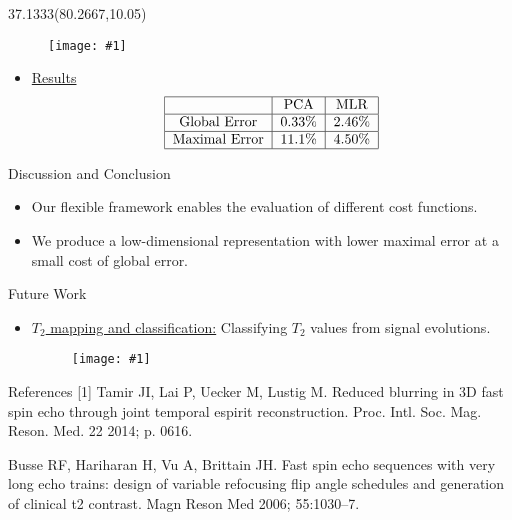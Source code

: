 \documentclass[t]{beamer}
\newcommand{\n}{\par \smallskip}
\newcommand{\imgnobox}[2]{\begin{figure}[htp]\texttt{[image: \#1]}\end{figure}}
\newcommand{\colwidth}{37.1333}
\begin{document}
{%
\begin{textblock}{\colwidth}(80.2667,10.05)
  \begin{frame}
  \begin{block}{\vspace*{-3ex}}
  \imgnobox{algo.png}{0.85}
  \begin{itemize}
  \item{\underline{Results}}
  $$\begin{tabular}{|c|c|c|} \hline
   & \text{PCA} & \text{MLR} \\ \hline
  \text{Global Error} & 0.33\%&   2.46\% \\ \hline
  \text{Maximal Error} & 11.1\% & 4.50\% \\ \hline
  \end{tabular}$$
  \end{itemize}
  \end{block}
  
  \begin{block}{Discussion and Conclusion}
  \begin{itemize}
  \item Our flexible framework enables the evaluation of different cost functions.
  \item We produce a low-dimensional representation
  with lower maximal error at a small cost of global error.
  \end{itemize}
  \end{block} 
  
  \begin{block}{Future Work}
  \begin{itemize}
  \item \underline{$T_2$ mapping and classification:} Classifying $T_2$ values from signal evolutions.
  \imgnobox{future.png}{0.8}
  \end{itemize}
  \end{block} 
  
  \begin{block}{References}
  [1] Tamir JI, Lai P, Uecker M, Lustig M. Reduced blurring in 3D fast spin echo through joint temporal espirit reconstruction. Proc. Intl. Soc. Mag. Reson. Med. 22 2014; p. 0616. \n
  [2] Busse RF, Hariharan H, Vu A, Brittain JH. Fast spin echo sequences with very long echo trains: design of variable refocusing flip angle schedules and generation of clinical t2 contrast. Magn Reson Med 2006; 55:1030–7. 
  \end{block} 
  

\end{frame}
\end{textblock}}
\end{document}
